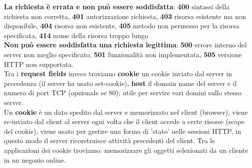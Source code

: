 \documentclass{article}
\begin{document}
\textbf{La richiesta è errata e non può essere soddisfatta}: \textbf{400} sintassi della richiesta non corretta, \textbf{401} autorizzazione richiesta, \textbf{403} risorsa esistente ma non disponibile, \textbf{404} risorsa non esistente, \textbf{405} metodo non permesso per la risorsa specificata, \textbf{414} nome della risorsa troppo lungo\\
\textbf{Non può essere soddisfatta una richiesta legittima}: \textbf{500} errore interno del server non meglio specificato, \textbf{501} funzionalità non implementata, \textbf{505} versione HTTP non supportata.\\
Tra i \textbf{request fields} invece troviamo \textbf{cookie} un cookie inviato dal server in precedenza (il server ha usato set-cookie), \textbf{host} il domain name del server e il numero di port TCP (opzionale se 80); utile per servire vari domini sullo stesso server.\\
Un \textbf{cookie} è un dato spedito dal server e memorizzato nel client (browser), viene re-inviato dal client al server ogni volta che il client accede a certe risorse (scope del cookie), viene usato per gestire una forma di 'stato' nelle sessioni HTTP, in questo modo il server ricorstruisce attività precedenti del client. Tra le applicazioni dei cookie troviamo: memorizzare gli oggetti selezionati da un cliente in un negozio online.
\end{document}
